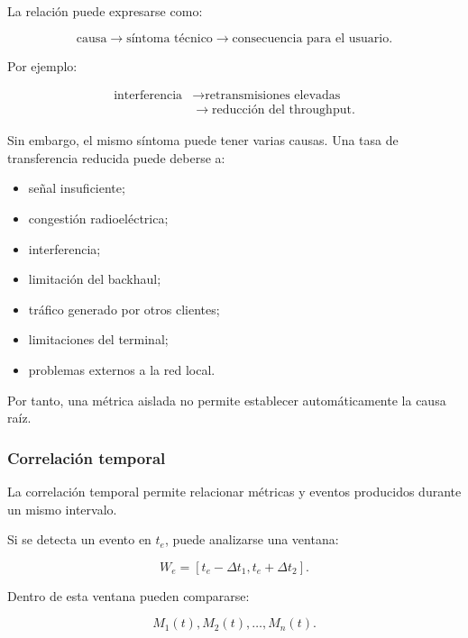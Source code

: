 La relación puede expresarse como:

\[
    \text{causa}
    \longrightarrow
    \text{síntoma técnico}
    \longrightarrow
    \text{consecuencia para el usuario}.
\]

Por ejemplo:

\[
\begin{aligned}
    \text{interferencia}
    &\longrightarrow
    \text{retransmisiones elevadas}\\
    &\longrightarrow
    \text{reducción del throughput}.
\end{aligned}
\]

Sin embargo, el mismo síntoma puede tener varias causas. Una tasa de
transferencia reducida puede deberse a:

\begin{itemize}
    \item señal insuficiente;

    \item congestión radioeléctrica;

    \item interferencia;

    \item limitación del backhaul;

    \item tráfico generado por otros clientes;

    \item limitaciones del terminal;

    \item problemas externos a la red local.
\end{itemize}

Por tanto, una métrica aislada no permite establecer automáticamente la
causa raíz.


\subsubsection*{Correlación temporal}

La correlación temporal permite relacionar métricas y eventos producidos
durante un mismo intervalo.

Si se detecta un evento en \(t_e\), puede analizarse una ventana:

\[
    W_e
    =
    [
        t_e-\Delta t_1,
        t_e+\Delta t_2
    ].
\]

Dentro de esta ventana pueden compararse:

\[
    M_1(t),
    M_2(t),
    \ldots,
    M_n(t).
\]

